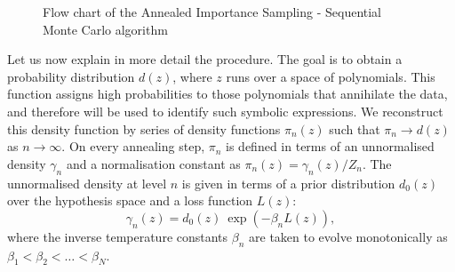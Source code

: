 \documentclass[11pt,a4paper]{article}
\begin{document}
\begin{figure}[h!]
\begin{minipage}{15cm}
\begin{tcolorbox}
				\end{tcolorbox}
			\end{minipage}
			\caption{Flow chart of the Annealed Importance Sampling - Sequential Monte Carlo algorithm}
			\label{ASMCflowchart}
		\end{figure}
		
		
Let us now explain in more detail the procedure. 
The goal is to obtain a probability distribution $d(z)$, where $z$ runs over a space of polynomials. 
This function assigns high probabilities to those polynomials that annihilate the data, and therefore will be used to identify such symbolic expressions.
We reconstruct this density function by series of density functions $\pi_n(z)$ such that $\pi_n\to d(z)$ as $n\to\infty$. 
On every annealing step, $\pi_n$ is defined in terms of an unnormalised density $\gamma_n$ and a normalisation constant as $\pi_n(z) = \gamma_n(z)/Z_n$.
The unnormalised density at level $n$ is given in terms of a prior distribution $d_0(z)$ over the hypothesis space and a loss function $L(z)$:
		\begin{equation}\label{eq:gamman}
			\gamma_n(z) = d_0(z) \: \exp \left( -\beta_n L(z) \right),
		\end{equation} 
where the inverse temperature constants $\beta_n$ are taken to evolve monotonically as $\beta_1 < \beta_2 <\dots< \beta_N$. 
\end{document}
